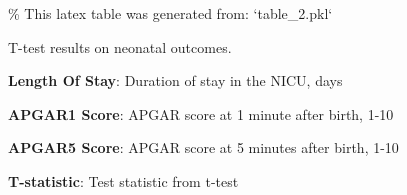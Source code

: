 \documentclass[11pt]{article}
\begin{document}
\begin{codeoutput}
\% This latex table was generated from: `table\_2.pkl`
\begin{table}[h]
\caption{Impact of change in treatment policy on neonatal outcomes.}
\label{table:Neonate\_Outcomes}
\begin{threeparttable}
\renewcommand{\TPTminimum}{\linewidth}
\begin{tablenotes}
\footnotesize
\item T-test results on neonatal outcomes.
\item \textbf{Length Of Stay}: Duration of stay in the NICU, days
\item \textbf{APGAR1 Score}: APGAR score at 1 minute after birth, 1-10
\item \textbf{APGAR5 Score}: APGAR score at 5 minutes after birth, 1-10
\item \textbf{T-statistic}: Test statistic from t-test
\end{tablenotes}
\end{threeparttable}
\end{table}

\end{codeoutput}
\end{document}
